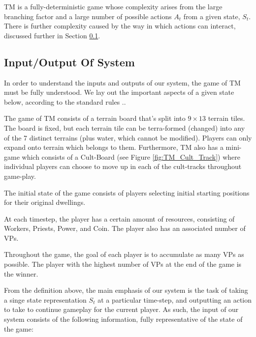 \documentclass[10pt,twocolumn,letterpaper]{article}
\begin{document}
TM is a fully-deterministic game whose complexity arises from the large branching factor and a large number of possible actions $A_t$ from a given state, $S_t$. There is further complexity caused by the way in which actions can interact, discussed further in Section \ref{subsection:input/output_of_system}.

\subsection{Input/Output Of System}
\label{subsection:input/output_of_system}
In order to understand the inputs and outputs of our system, the game of TM must be fully understood. We lay out the important aspects of a given state below, according to the standard rules \cite{TMRules}..

The game of TM consists of a terrain board that's split into $9 \times 13$ terrain tiles. The board is fixed, but each terrain tile can be terra-formed (changed) into any of the 7 distinct terrains (plus water, which cannot be modified). Players can only expand onto terrain which belongs to them. Furthermore, TM also has a mini-game which consists of a Cult-Board (see Figure \ref{fig:TM_Cult_Track}) where individual players can choose to move up in each of the cult-tracks throughout game-play. 

The initial state of the game consists of players selecting initial starting positions for their original dwellings. 

At each timestep, the player has a certain amount of resources, consisting of Workers, Priests, Power, and Coin. The player also has an associated number of VPs.

Throughout the game, the goal of each player is to accumulate as many VPs as possible. The player with the highest number of VPs at the end of the game is the winner.

From the definition above, the main emphasis of our system is the task of taking a singe state representation $S_t$ at a particular time-step, and outputting an action to take to continue gameplay for the current player. As such, the input of our system consists of the following information, fully representative of the state of the game:
\end{document}
